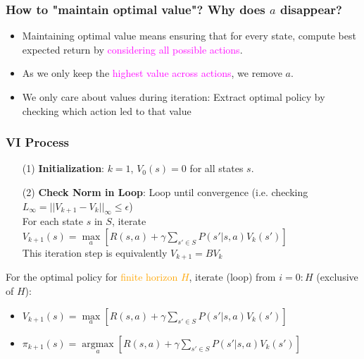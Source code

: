 \documentclass{article}
\begin{document}
\begin{hintbox}
    \subsubsection*{How to "maintain optimal value"? Why does $a$ disappear?}
    \begin{prfbox}
        \begin{itemize}
            \item Maintaining optimal value means ensuring that for every state, compute best expected return by \textcolor{magenta}{considering all possible actions}. 
            \item As we only keep the \textcolor{magenta}{highest value across actions}, we remove $a$.
            \item We only care about values during iteration: Extract optimal policy by checking which action led to that value
        \end{itemize}
    \end{prfbox}
\end{hintbox}

\begin{thmbox}
    \subsubsection*{VI Process}
    \begin{enumerate}
    \item [(1)] \textbf{Initialization}: $k = 1$, $V_0(s) = 0$ for all states $s$.
    \item [(2)] \textbf{Check Norm in Loop}: Loop until convergence (i.e. checking $L_{\infty} = ||V_{k+1} - V_{k}||_{\infty} \leq \epsilon$)
          \\For each state $s$ in $S$, iterate $V_{k+1}(s) = \mathop{\max}\limits_{a} \left[ R(s, a) + \gamma \sum_{s' \in S} P(s' | s, a) V_{k}(s') \right]$
          \\This iteration step is equivalently $V_{k+1} = BV_k$
    \end{enumerate}
    For the optimal policy for \textcolor{orange}{finite horizon $H$}, iterate (loop) from $i = 0:H$ (exclusive of $H$):
    \begin{itemize}
    \item $V_{k+1}(s) = \mathop{\max}\limits_{a} \left[ R(s, a) + \gamma \sum_{s' \in S} P(s' | s, a) V_{k} (s') \right]$
    \item $\pi_{k+1}(s) = \mathop{\arg \max}\limits_{a} \left[ R(s, a) + \gamma \sum_{s' \in S} P(s' | s, a) V_{k} (s') \right]$
    \end{itemize}
\end{thmbox}
\end{document}
